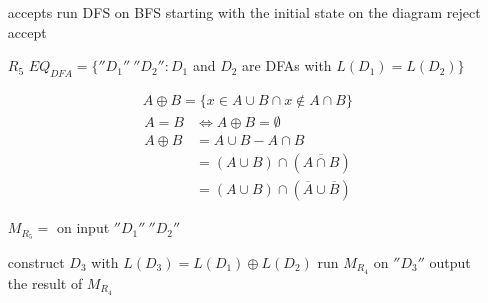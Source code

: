 \begin{enumerate}
\begin{algorithm}[H]
\begin{algorithmic}
                \State accepts
            \Else
                \State run DFS on BFS starting with the initial state on the diagram
                    \State reject
                \Else
                    \State accept
                \EndIf
            \EndIf
        \end{algorithmic}
    \end{algorithm}
    \item [$R_5$] $EQ_{DFA}=\{ ''D_1''\ ''D_2'': D_1$ and $D_2$ are DFAs with $L(D_1)=L(D_2) \}$
    \begin{definition}
        \begin{align*}
            A \oplus B = \{ x\in A\cup B \cap x \notin A\cap B \}
        \end{align*}
        \begin{align*}
            A=B &\iff A\oplus B=\emptyset\\
            A\oplus B&=A\cup B-A\cap B\\
            &= (A\cup B)\cap (\overline{A\cap B})\\
            &=(A\cup B)\cap (\overline{A}\cup \overline{B})
        \end{align*}
    \end{definition}
    \subitem $M_{R_5}=$ on input $''D_1''\ ''D_2''$

    \begin{algorithm}[H]
        \caption{$R_5$}
        \begin{algorithmic}
            \State construct $D_3$ with $L(D_3)=L(D_1)\oplus L(D_2)$
            \State run $M_{R_4}$ on $''D_3''$
            \State output the result of $M_{R_4}$
        \end{algorithmic}
    \end{algorithm}
\end{enumerate}

